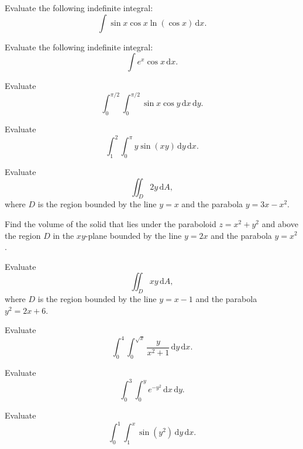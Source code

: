 \documentclass[11pt]{article}
\theoremstyle{break}
\theoremstyle{no_label}
\newcommand{\ddi}{\text{$\,$d}}
\numberwithin{equation}{theorem}
\begin{document}
\begin{example}
    Evaluate the following indefinite integral: $$\int \sin x\cos x\ln(\cos x)\ddi x.$$
\end{example}
\vspace{10em}

\begin{example}
    Evaluate the following indefinite integral: $$\int e^x\cos x\ddi x.$$
\end{example}
\vspace{10em}

\begin{example}
    Evaluate $$\int_{0}^{\pi/2}\int_{0}^{\pi/2}\sin x\cos y\ddi x\ddi y.$$
\end{example}
\vspace{10em}

\begin{example}
    Evaluate $$\int_{1}^{2}\int_{0}^{\pi}y\sin(xy)\ddi y\ddi x.$$
\end{example}
\newpage

\begin{example}
    Evaluate $$\iint_D 2y \ddi A,$$ where $D$ is the region bounded by the line $y=x$ and the parabola $y=3x-x^2$.
\end{example}
\newpage

\begin{example}
    Find the volume of the solid that lies under the paraboloid $z=x^2+y^2$ and above the region $D$ in the $xy$-plane bounded by the line $y=2x$ and the parabola $y=x^2$.
\end{example}
\newpage

\begin{example}
    Evaluate $$\iint_D xy\ddi A,$$ where $D$ is the region bounded by the line $y=x-1$ and the parabola $y^2=2x+6$.
\end{example}
\newpage

\begin{example}
    Evaluate $$\int_{0}^{4}\int_{0}^{\sqrt{x}}\dfrac{y}{x^2+1}\ddi y\ddi x.$$
\end{example}
\newpage

\begin{example}
    Evaluate $$\int_{0}^{3}\int_{0}^{y}e^{-y^2}\ddi x\ddi y.$$
\end{example}
\newpage

\begin{example}
    Evaluate $$\int_{0}^{1}\int_{1}^{x}\sin(y^2)\ddi y\ddi x.$$
\end{example}
\newpage
\end{document}
